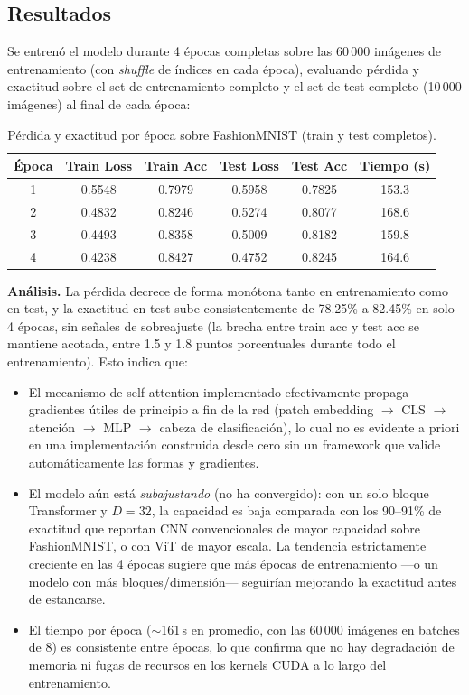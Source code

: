 \documentclass[11pt,a4paper]{article}
\begin{document}
\subsection{Resultados}
\label{sec:resultados}

Se entrenó el modelo durante 4 épocas completas sobre las 60\,000 imágenes
de entrenamiento (con \emph{shuffle} de índices en cada época), evaluando
pérdida y exactitud sobre el set de entrenamiento completo y el set de test
completo (10\,000 imágenes) al final de cada época:

\begin{table}[h]
\centering
\begin{tabular}{cccccc}
\toprule
\textbf{Época} & \textbf{Train Loss} & \textbf{Train Acc} & \textbf{Test Loss} & \textbf{Test Acc} & \textbf{Tiempo (s)} \\
\midrule
1 & 0.5548 & 0.7979 & 0.5958 & 0.7825 & 153.3 \\
2 & 0.4832 & 0.8246 & 0.5274 & 0.8077 & 168.6 \\
3 & 0.4493 & 0.8358 & 0.5009 & 0.8182 & 159.8 \\
4 & 0.4238 & 0.8427 & 0.4752 & 0.8245 & 164.6 \\
\bottomrule
\end{tabular}
\caption{Pérdida y exactitud por época sobre FashionMNIST (train y test completos).}
\label{tab:resultados}
\end{table}

\textbf{Análisis.} La pérdida decrece de forma monótona tanto en
entrenamiento como en test, y la exactitud en test sube consistentemente de
78.25\% a 82.45\% en solo 4 épocas, sin señales de sobreajuste (la brecha
entre train acc y test acc se mantiene acotada, entre 1.5 y 1.8 puntos
porcentuales durante todo el entrenamiento). Esto indica que:

\begin{itemize}
  \item El mecanismo de self-attention implementado efectivamente propaga
  gradientes útiles de principio a fin de la red (patch embedding
  $\rightarrow$ CLS $\rightarrow$ atención $\rightarrow$ MLP
  $\rightarrow$ cabeza de clasificación), lo cual no es evidente a priori
  en una implementación construida desde cero sin un framework que valide
  automáticamente las formas y gradientes.
  \item El modelo aún está \emph{subajustando} (no ha convergido): con un
  solo bloque Transformer y $D=32$, la capacidad es baja comparada con los
  90--91\% de exactitud que reportan CNN convencionales de mayor capacidad
  sobre FashionMNIST, o con ViT de mayor escala. La tendencia estrictamente
  creciente en las 4 épocas sugiere que más épocas de entrenamiento
  ---o un modelo con más bloques/dimensión--- seguirían mejorando la
  exactitud antes de estancarse.
  \item El tiempo por época ($\sim$161\,s en promedio, con las 60\,000
  imágenes en batches de 8) es consistente entre épocas, lo que confirma
  que no hay degradación de memoria ni fugas de recursos en los kernels
  CUDA a lo largo del entrenamiento.
\end{itemize}
\end{document}
